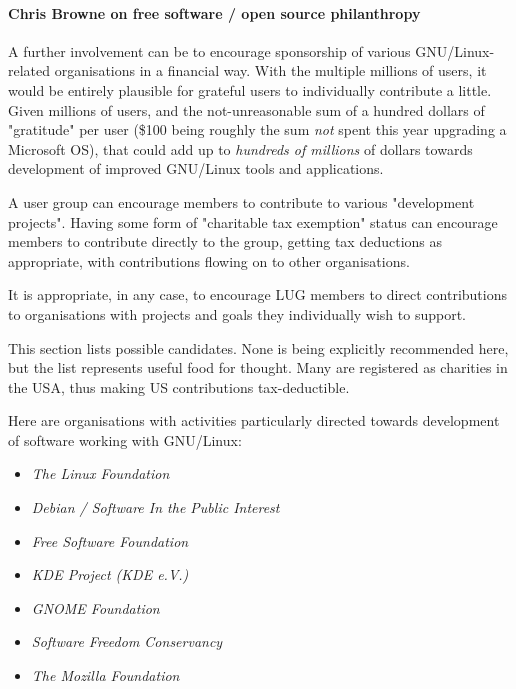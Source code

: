 \paragraph{Chris Browne on free software / open source philanthropy}

 
A further involvement can be to encourage sponsorship of various
GNU/Linux-related organisations in a financial way.  With the 
multiple millions of users, it would be entirely plausible for grateful 
users to individually contribute a little. Given millions of users, and 
the not-unreasonable sum of a hundred dollars of "gratitude" per user (\$100 being
roughly the sum {\itshape not\/} spent this year upgrading a Microsoft OS),
that could add up to {\itshape hundreds of millions\/} of dollars towards
development of improved GNU/Linux tools and applications.



 
A user group can encourage members to contribute to various
"development projects". Having some form of "charitable tax exemption"
status can encourage members to contribute directly to the group,
getting tax deductions as appropriate, with contributions flowing on to
other organisations.



 
It is appropriate, in any case, to encourage LUG members to direct
contributions to organisations with projects and goals they
individually wish to support.



 
This section lists possible candidates. None is being explicitly 
recommended here, but the list represents useful food for
thought.  Many are registered as charities in the USA, thus
making US contributions tax-deductible.



Here are organisations with activities particularly directed towards
development of software working with GNU/Linux:

\begin{itemize}
\item 
\emph{The Linux Foundation} \texttt{\adhurl}
\item 
\emph{Debian / Software In the Public Interest} \texttt{\adiurl}
\item 
\emph{Free Software Foundation} \texttt{\adjurl}
 
\item 
\emph{KDE Project (KDE e.V.)} \texttt{\adkurl}
\item 
\emph{GNOME Foundation} \texttt{\adlurl}
\item 
\emph{Software Freedom Conservancy} \texttt{\admurl}
\item 
\emph{The Mozilla Foundation} \texttt{\adnurl}
\end{itemize}





